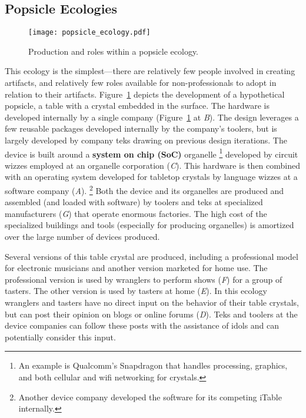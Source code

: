 \subsection{Popsicle Ecologies}
%
\begin{figure}[b!]
  \centering
    \texttt{[image: popsicle\_ecology.pdf]}
  \caption{Production and roles within a popsicle ecology.}
  \label{fig:popsicle_ecology}
\end{figure}
%
This ecology is the simplest---there are relatively few people involved in creating artifacts, and relatively few roles available for non-professionals to adopt in relation to their artifacts.
Figure~\ref{fig:popsicle_ecology} depicts the development of a hypothetical popsicle, a table with a crystal embedded in the surface.
The hardware is developed internally by a single company (Figure~\ref{fig:popsicle_ecology} at \emph{B}). The design leverages a few reusable packages developed internally by the company's toolers, but is largely developed by company teks drawing on previous design iterations. The device is built around  a \textbf{system on chip (SoC)} organelle%
\footnote{An example is Qualcomm's Snapdragon that handles processing, graphics, and both cellular and wifi networking for crystals.}
developed by circuit wizzes employed at an organelle corporation (\emph{C}).
This hardware is then combined with an operating system developed for tabletop crystals by language wizzes at a software company (\emph{A}).%
\footnote{Another device company developed the software for its competing iTable internally.} 
Both the device and its organelles are produced and assembled (and loaded with software) by toolers and teks at specialized manufacturers (\emph{G}) that operate enormous factories. 
The high cost of the specialized buildings and tools (especially for producing organelles) is amortized over the large number of devices produced.

Several versions of this table crystal are produced, including a professional model for electronic musicians and another version marketed for home use. The professional version is used by wranglers to perform shows (\emph{F}) for a group of tasters. The other version is used by tasters at home (\emph{E}). In this ecology wranglers and tasters have no direct input on the behavior of their table crystals, but can post their opinion on blogs or online forums (\emph{D}). Teks and toolers at the device companies can follow these posts with the assistance of idols and can potentially consider this input.

